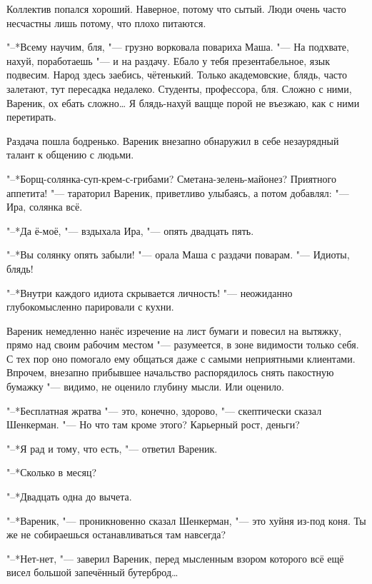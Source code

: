\asterism

\label{Fri_2012_04_27}

Коллектив попался хороший.
Наверное, потому что сытый.
Люди очень часто несчастны лишь потому, что плохо питаются.

"--*Всему научим, бля, "--- грузно ворковала повариха Маша.
"--- На подхвате, нахуй, поработаешь "--- и на раздачу.
Ебало у тебя презентабельное, язык подвесим.
Народ здесь заебись, чётенький.
Только академовские, блядь, часто залетают, тут пересадка недалеко.
Студенты, профессора, бля.
Сложно с ними, Вареник, ох ебать сложно\ldots{}
Я блядь-нахуй ващще порой не въезжаю, как с ними перетирать.

Раздача пошла бодренько.
Вареник внезапно обнаружил в себе незаурядный талант к общению с людьми.

"--*Борщ-солянка-суп-крем-с-грибами?
Сметана-зелень-майонез?
Приятного аппетита! "--- тараторил Вареник, приветливо улыбаясь, а потом добавлял:
"--- Ира, солянка всё.

"--*Да ё-моё, "--- вздыхала Ира, "--- опять двадцать пять.

"--*Вы солянку опять забыли! "--- орала Маша с раздачи поварам.
"--- Идиоты, блядь!

"--*Внутри каждого идиота скрывается личность! "--- неожиданно глубокомысленно парировали с кухни.

Вареник немедленно нанёс изречение на лист бумаги и повесил на вытяжку, прямо над своим рабочим местом "--- разумеется, в зоне видимости только себя.
С тех пор оно помогало ему общаться даже с самыми неприятными клиентами.
Впрочем, внезапно прибывшее начальство распорядилось снять пакостную бумажку "--- видимо, не оценило глубину мысли.
Или оценило.

\asterism

\textspace

\label{Sun_2012_04_29}

"--*Бесплатная жратва "--- это, конечно, здорово, "--- скептически сказал Шенкерман.
"--- Но что там кроме этого?
Карьерный рост, деньги?

"--*Я рад и тому, что есть, "--- ответил Вареник.

"--*Сколько в месяц?

"--*Двадцать одна до вычета.

"--*Вареник, "--- проникновенно сказал Шенкерман, "--- это хуйня из-под коня.
Ты же не собираешься останавливаться там навсегда?

"--*Нет-нет, "--- заверил Вареник, перед мысленным взором которого всё ещё висел большой запечённый бутерброд\ldots{}

